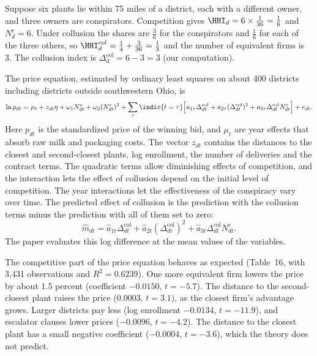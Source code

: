 \begin{example}\label{ex:13-pz99-delta}
Suppose six plants lie within 75 miles of a district, each with a different owner, and three owners are
conspirators. Competition gives $\HHI_d = 6 \times \frac{1}{36} = \frac{1}{6}$ and $N^e_d = 6$. Under collusion the
shares are $\frac{3}{6}$ for the conspirators and $\frac{1}{6}$ for each of the three others, so
$\HHI^{\mathrm{col}}_d = \frac{1}{4} + \frac{3}{36} = \frac{1}{3}$ and the number of equivalent firms is 3. The
collusion index is $\Delta^{\mathrm{col}}_d = 6 - 3 = 3$ (our computation).
\end{example}

The price equation, estimated by ordinary least squares on about 400 districts including districts outside
southwestern Ohio, is
\begin{equation}\label{eq:13-pz99-damages}
  \ln p_{dt} = \mu_t + z_{dt}\eta + \omega_1 N^e_{dt} + \omega_2 (N^e_{dt})^2
  + \sum_{\tau}\indic\{t = \tau\}\Bigl[a_{1\tau}\Delta^{\mathrm{col}}_{dt} + a_{2\tau}(\Delta^{\mathrm{col}}_{dt})^2
  + a_{3\tau}\Delta^{\mathrm{col}}_{dt}N^e_{dt}\Bigr] + e_{dt} .
\end{equation}
Here $p_{dt}$ is the standardized price of the winning bid, and $\mu_t$ are year effects that absorb raw milk and
packaging costs. The vector $z_{dt}$ contains the distances to the closest and second-closest plants, log
enrollment, the number of deliveries and the contract terms. The quadratic terms allow diminishing effects of competition, and the
interaction lets the effect of collusion depend on the initial level of competition. The year interactions let the
effectiveness of the conspiracy vary over time. The predicted effect of collusion is the prediction with the
collusion terms minus the prediction with all of them set to zero:
\begin{equation}\label{eq:13-pz99-effect}
  \hat m_{dt} = \hat a_{1t}\Delta^{\mathrm{col}}_{dt} + \hat a_{2t}(\Delta^{\mathrm{col}}_{dt})^2
  + \hat a_{3t}\Delta^{\mathrm{col}}_{dt}N^e_{dt} .
\end{equation}
The paper evaluates this log difference at the mean values of the variables.

The competitive part of the price equation behaves as expected (Table~16, with 3,431 observations and $R^2 = 0.6239$). One
more equivalent firm lowers the price by about 1.5 percent (coefficient $-0.0150$, $t = -5.7$). The distance to the
second-closest plant raises the price (0.0003, $t = 3.1$), as the closest firm's advantage grows. Larger districts
pay less (log enrollment $-0.0134$, $t = -11.9$), and escalator clauses lower prices ($-0.0096$, $t = -4.2$). The
distance to the closest plant has a small negative coefficient ($-0.0004$, $t = -3.6$), which the theory does not
predict.

